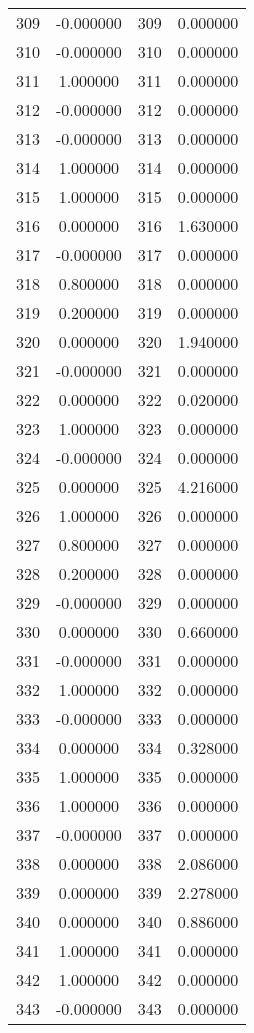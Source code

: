 \documentclass[12pt]{article}
\begin{document}
\begin{longtable}{@{}cccc@{}}
309 & -0.000000 & 309 & 0.000000 \\
310 & -0.000000 & 310 & 0.000000 \\
311 & 1.000000 & 311 & 0.000000 \\
312 & -0.000000 & 312 & 0.000000 \\
313 & -0.000000 & 313 & 0.000000 \\
314 & 1.000000 & 314 & 0.000000 \\
315 & 1.000000 & 315 & 0.000000 \\
316 & 0.000000 & 316 & 1.630000 \\
317 & -0.000000 & 317 & 0.000000 \\
318 & 0.800000 & 318 & 0.000000 \\
319 & 0.200000 & 319 & 0.000000 \\
320 & 0.000000 & 320 & 1.940000 \\
321 & -0.000000 & 321 & 0.000000 \\
322 & 0.000000 & 322 & 0.020000 \\
323 & 1.000000 & 323 & 0.000000 \\
324 & -0.000000 & 324 & 0.000000 \\
325 & 0.000000 & 325 & 4.216000 \\
326 & 1.000000 & 326 & 0.000000 \\
327 & 0.800000 & 327 & 0.000000 \\
328 & 0.200000 & 328 & 0.000000 \\
329 & -0.000000 & 329 & 0.000000 \\
330 & 0.000000 & 330 & 0.660000 \\
331 & -0.000000 & 331 & 0.000000 \\
332 & 1.000000 & 332 & 0.000000 \\
333 & -0.000000 & 333 & 0.000000 \\
334 & 0.000000 & 334 & 0.328000 \\
335 & 1.000000 & 335 & 0.000000 \\
336 & 1.000000 & 336 & 0.000000 \\
337 & -0.000000 & 337 & 0.000000 \\
338 & 0.000000 & 338 & 2.086000 \\
339 & 0.000000 & 339 & 2.278000 \\
340 & 0.000000 & 340 & 0.886000 \\
341 & 1.000000 & 341 & 0.000000 \\
342 & 1.000000 & 342 & 0.000000 \\
343 & -0.000000 & 343 & 0.000000 \\

\end{longtable}
\end{document}
